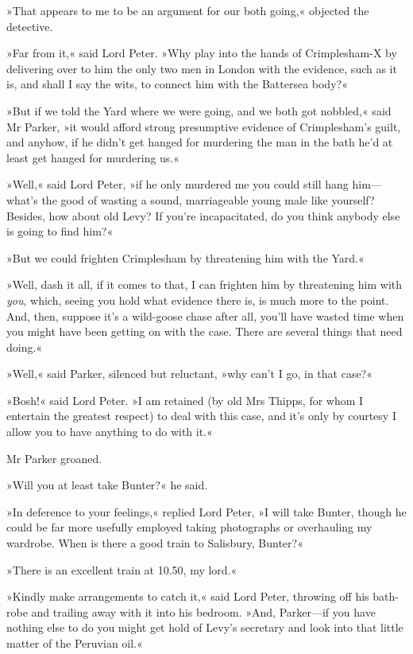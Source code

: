 »That appears to me to be an argument for our both going,« objected the detective.

»Far from it,« said Lord Peter. »Why play into the hands of Crimplesham-X by delivering over to him the only two men in London with the evidence, such as it is, and shall I say the wits, to connect him with the Battersea body?«

»But if we told the Yard where we were going, and we both got nobbled,« said Mr Parker, »it would afford strong presumptive evidence of Crimplesham's guilt, and anyhow, if he didn't get hanged for murdering the man in the bath he'd at least get hanged for murdering us.«

»Well,« said Lord Peter, »if he only murdered me you could still hang him\allowbreak---\allowbreak what's the good of wasting a sound, marriageable young male like yourself? Besides, how about old Levy? If you're incapacitated, do you think anybody else is going to find him?«

»But we could frighten Crimplesham by threatening him with the Yard.«

»Well, dash it all, if it comes to that, I can frighten him by threatening him with \textit{you}, which, seeing you hold what evidence there is, is much more to the point. And, then, suppose it's a wild-goose chase after all, you'll have wasted time when you might have been getting on with the case. There are several things that need doing.«

»Well,« said Parker, silenced but reluctant, »why can't I go, in that case?«

»Bosh!« said Lord Peter. »I am retained (by old Mrs Thipps, for whom I entertain the greatest respect) to deal with this case, and it's only by courtesy I allow you to have anything to do with it.«

Mr Parker groaned.

»Will you at least take Bunter?« he said.

»In deference to your feelings,« replied Lord Peter, »I will take Bunter, though he could be far more usefully employed taking photographs or overhauling my wardrobe. When is there a good train to Salisbury, Bunter?«

»There is an excellent train at 10.50, my lord.«

»Kindly make arrangements to catch it,« said Lord Peter, throwing off his bath-robe and trailing away with it into his bedroom. »And, Parker\allowbreak---\allowbreak if you have nothing else to do you might get hold of Levy's secretary and look into that little matter of the Peruvian oil.«

